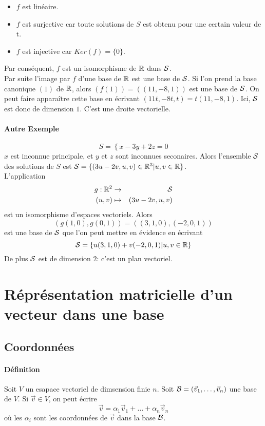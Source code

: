 \begin{itemize}
  \item $f$ est linéaire.
  \item $f$ est surjective car toute solutions de $S$ est obtenu pour une certain valeur de t.
  \item $f$ est injective car $Ker(f) = \{0\}$.
\end{itemize}
Par conséquent, $f$ est un isomorphisme de $\mathbb{R}$ dans $\mathcal{S}$. \\
Par suite l'image par $f$ d'une base de $\mathbb{R}$ est une base de $\mathcal{S}$. Si l'on prend la base canonique $(1)$ de $\mathbb{R}$, alors $(f(1)) = ((11, -8, 1))$ est une base de $\mathcal{S}$. On peut faire apparaître cette base en écrivant $(11t, -8t, t) = t (11, -8, 1)$. Ici, $\mathcal{S}$ est donc de dimension $1$. C'est une droite vectorielle.

\paragraph{Autre Exemple}
$$S = \left\{ x - 3y + 2z = 0 \right.$$
$x$ est inconnue principale, et $y$ et $z$ sont inconnues seconaires. Alors l'ensemble $\mathcal{S}$ des solutions de $S$ est $\mathcal{S} = \{(3u - 2v, u, v) \in \mathbb{R}^3 \vert u, v \in \mathbb{R} \}$. \\
L'application 
\begin{eqnarray*}  
  g: \mathbb{R}^2 &\rightarrow& \mathcal{S} \\
    (u, v) & \mapsto & (3u - 2v, u, v)
\end{eqnarray*}
est un isomorphisme d'espaces vectoriels. Alors 
$$(g(1, 0), g(0, 1)) = \left( (3, 1, 0), (-2, 0, 1) \right)$$ 
est une base de $\mathcal{S}$ que l'on peut mettre en évidence en écrivant
$$\mathcal{S} = \left\{ u(3, 1, 0) + v(-2, 0, 1) \vert u, v \in \mathbb{R} \right\}$$
De plus $\mathcal{S}$ est de dimension $2$: c'est un plan vectoriel.
  
%
%
\section{Réprésentation matricielle d'un vecteur dans une base}
%
%

%
\subsection{Coordonnées}
%
\paragraph{Définition} Soit $V$ un esapace vectoriel de dimsension finie $n$. Soit $\mathcal{B} = (\vec{v}_1, \ldots, \vec{v}_n)$ une base de $V$. Si $\vec{v} \in V$, on peut écrire 
$$\vec{v} = \alpha_1 \vec{v}_1 + \ldots + \alpha_n \vec{v}_n$$
où les $\alpha_i$ sont les coordonnées de $\vec{v}$ dans la base $\mathcal{B}$.

